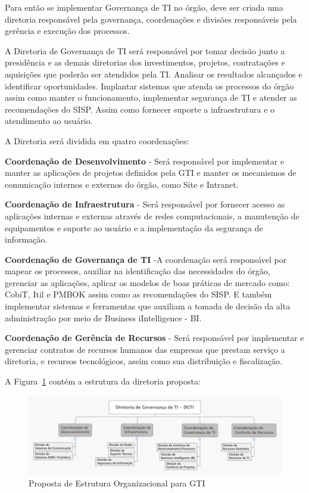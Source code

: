 Para então se implementar Governança de TI no órgão, deve ser criada uma diretoria responsável pela governança, coordenações e divisões responsáveis pela gerência e execução dos processos.

A Diretoria de Governança de TI será responsável por tomar decisão junto a presidência e as demais diretorias dos investimentos, projetos, contratações e aquisições que poderão ser atendidos pela TI. Analisar os resultados alcançados e identificar oportunidades. Implantar sistemas que atenda os processos do órgão assim como manter o funcionamento, implementar segurança de TI e atender as recomendações do SISP. Assim como fornecer suporte a infraestrutura e o atendimento ao usuário.

A Diretoria será dividida em quatro coordenações:

\textbf{Coordenação de Desenvolvimento} - Será responsável por implementar e manter as aplicações de projetos definidos pela GTI e manter os mecanismos de comunicação internos e externos do órgão, como Site e Intranet.

\textbf{Coordenação de Infraestrutura} - Será responsável por fornecer acesso as aplicações internas e externas através de redes computacionais, a manutenção de equipamentos e suporte ao usuário e a implementação da segurança de informação.

\textbf{Coordenação de Governança de TI} -A coordenação será responsável por mapear os processos, auxiliar na identificação das necessidades do órgão, gerenciar as aplicações, aplicar os modelos de boas práticas de mercado como: CobiT, Itil e PMBOK assim como as recomendações do SISP. E também implementar sistemas e ferramentas que auxiliam a tomada de decisão da alta administração por meio de Business iIntelligence - BI.

\textbf{Coordenação de Gerência de Recursos} - Será responsável por implementar e gerenciar contratos de recursos humanos das empresas que prestam serviço a diretoria, e recursos tecnológicos, assim como sua distribuição e fiscalização.

A Figura~\ref{fig:propostaOrg} contém a estrutura da diretoria proposta:

\begin{figure}[ht]
\centering
\includegraphics[width=1.0\textwidth]{DGTI.png}
\caption{Proposta de Estrutura Organizacional para GTI}
\label{fig:propostaOrg}
\end{figure}

